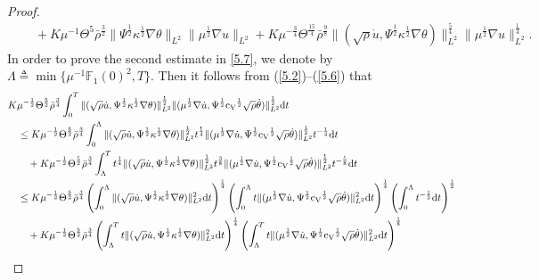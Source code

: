 \documentclass[11pt]{article}
\newcommand{\na}{\nabla}
\begin{document}
\begin{proof}
\begin{align*}
& \quad + K \mu^{-1} \Theta^5 \bar{\rho}^{\frac{3}{2}} \|\Psi^{\frac{1}{2}} \kappa^{\frac{1}{2}} \na \theta\|_{L^2} \|\mu^{\frac{1}{2}}\na u\|_{L^2} + K \mu^{-\frac{3}{4}} \Theta^{\frac{15}{4}} \bar{\rho}^{\frac{9}{8}} \|(\sqrt{\rho} \dot{u}, \Psi^{\frac{1}{2}} \kappa^{\frac{1}{2}} \na \theta)\|_{L^2}^{\frac{5}{4}} \|\mu^{\frac{1}{2}}\na u\|_{L^2}^{\frac{1}{4}}.
\end{align*}
In order to prove the second estimate in \eqref{5.7}, we denote by $\Lambda \triangleq \min\{\mu^{-1} \mathbb{F}_1 (0)^2, T\}$. Then it follows from (\ref{5.2})--(\ref{5.6}) that
\begin{align*}
& K \mu^{-\frac{1}{2}} \Theta^{\frac{5}{2}} \bar{\rho}^{\frac{3}{4}} \int^T_0 \|(\sqrt{\rho} \dot{u}, \Psi^{\frac{1}{2}} \kappa^{\frac{1}{2}} \na \theta)\|_{L^2}^{\frac{1}{2}} \|(\mu^{\frac{1}{2}}\na \dot{u}, \Psi^{\frac{1}{2}} {\rm c_V}^{\frac{1}{2}} \sqrt{\rho} \dot{\theta})\|_{L^2}^{\frac{1}{2}} {\rm d} t \\
& \quad \leq K \mu^{-\frac{1}{2}} \Theta^{\frac{5}{2}} \bar{\rho}^{\frac{3}{4}} \int^{\Lambda}_0 \|(\sqrt{\rho} \dot{u}, \Psi^{\frac{1}{2}} \kappa^{\frac{1}{2}} \na \theta)\|_{L^2}^{\frac{1}{2}} t^{\frac{1}{4}} \|(\mu^{\frac{1}{2}}\na \dot{u}, \Psi^{\frac{1}{2}} {\rm c_V}^{\frac{1}{2}} \sqrt{\rho} \dot{\theta})\|_{L^2}^{\frac{1}{2}} t^{-\frac{1}{4}} {\rm d} t\\
& \qquad + K \mu^{-\frac{1}{2}} \Theta^{\frac{5}{2}} \bar{\rho}^{\frac{3}{4}} \int_{\Lambda}^T t^{\frac{1}{4}} \|(\sqrt{\rho} \dot{u}, \Psi^{\frac{1}{2}} \kappa^{\frac{1}{2}} \na \theta)\|_{L^2}^{\frac{1}{2}} t^{\frac{3}{8}} \|(\mu^{\frac{1}{2}}\na \dot{u}, \Psi^{\frac{1}{2}} {\rm c_V}^{\frac{1}{2}} \sqrt{\rho} \dot{\theta})\|_{L^2}^{\frac{1}{2}} t^{- \frac{5}{8}} {\rm d} t\\
& \quad \leq K \mu^{-\frac{1}{2}} \Theta^{\frac{5}{2}} \bar{\rho}^{\frac{3}{4}} \left(\int^{\Lambda}_0 \|(\sqrt{\rho} \dot{u}, \Psi^{\frac{1}{2}} \kappa^{\frac{1}{2}} \na \theta)\|_{L^2}^2 {\rm d} t \right)^{\frac{1}{4}} \left(\int^{\Lambda}_0  t \|(\mu^{\frac{1}{2}}\na \dot{u}, \Psi^{\frac{1}{2}} {\rm c_V}^{\frac{1}{2}} \sqrt{\rho} \dot{\theta})\|_{L^2}^2 {\rm d} t \right)^{\frac{1}{4}} \left(\int^{\Lambda}_0 t^{-\frac{1}{2}} {\rm d} t \right)^{\frac{1}{2}}\\
& \qquad + K \mu^{-\frac{1}{2}} \Theta^{\frac{5}{2}} \bar{\rho}^{\frac{3}{4}} \left(\int_{\Lambda}^T t \|(\sqrt{\rho} \dot{u}, \Psi^{\frac{1}{2}} \kappa^{\frac{1}{2}} \na \theta)\|_{L^2}^2 {\rm d} t \right)^{\frac{1}{4}} \left(\int_{\Lambda}^T t \|(\mu^{\frac{1}{2}}\na \dot{u}, \Psi^{\frac{1}{2}} {\rm c_V}^{\frac{1}{2}} \sqrt{\rho} \dot{\theta})\|_{L^2}^2 {\rm d} t \right)^{\frac{1}{8}}\\

\end{align*}
\end{proof}
\end{document}
